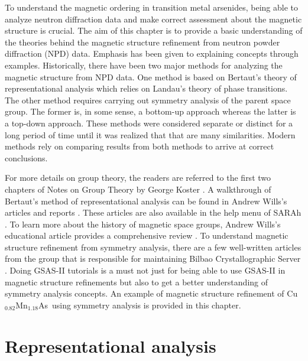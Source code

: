 \documentclass[10pt,doublespacing,edeposit]{uiucthesis2020}
\newcommand*{\cumnas}{Cu$_{0.82}$Mn$_{1.18}$As}
\begin{document}
\begin{mainmatter}
To understand the magnetic ordering in transition metal arsenides, being able to analyze neutron diffraction data and make correct assessment about the magnetic structure is crucial. The aim of this chapter is to provide a basic understanding of the theories behind the magnetic structure refinement from neutron powder diffraction (NPD) data. Emphasis has been given to explaining concepts through examples. Historically, there have been two major methods for analyzing the magnetic structure from NPD data. One method is based on Bertaut's theory of representational analysis which relies on Landau's theory of phase transitions. The other method requires carrying out symmetry analysis of the parent space group. The former is, in some sense, a bottom-up approach whereas the latter is a top-down approach. These methods were considered separate or distinct for a long period of time until it was realized that that are many similarities. Modern methods rely on comparing results from both methods to arrive at correct conclusions.

For more details on group theory, the readers are referred to the first two chapters of Notes on Group Theory by George Koster \cite{Koster1956}. A walkthrough of Bertaut's method of representational analysis can be found in Andrew Wills's articles and reports \cite{Wills2001,Wills2019}. These articles are also available in the help menu of SARAh \cite{WILLS2000680,Wills2009}. To learn more about the history of magnetic space groups, Andrew Wills's educational article provides a comprehensive review \cite{Wills2017}. To understand magnetic structure refinement from symmetry analysis, there are a few well-written articles from the group that is responsible for maintaining Bilbao Crystallographic Server \cite{Perez-Mato2015,Gallego2016_1,Gallego2016_2}.  Doing \textsc{GSAS-II} \cite{Toby:aj5212} tutorials is a must not just for being able to use \textsc{GSAS-II} in magnetic structure refinements but also to get a better understanding of symmetry analysis concepts. An example of magnetic structure refinement of \cumnas\ using symmetry analysis is provided in this chapter.


\section{Representational analysis}


\end{mainmatter}
\end{document}
